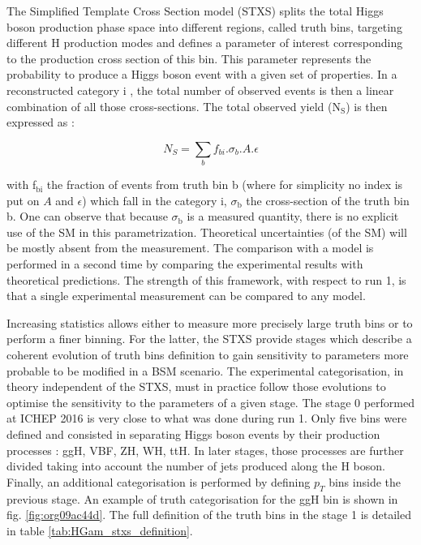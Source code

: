 The Simplified Template Cross Section \cite{arXiv_1605.04692} model (STXS) splits the total Higgs boson production phase space into different regions, called truth bins, targeting different H production modes and defines a parameter of interest corresponding to the production cross section of this bin.
This parameter represents the probability to produce a Higgs boson event with a given set of properties.
In a reconstructed category i , the total number of observed events is then a linear combination of all those cross-sections.
The total observed yield (N\(_{\text{S}}\)) is then expressed as :

\begin{equation}
N_S = \sum\limits_{b} f_{bi} .\sigma_{b} . A . \epsilon
\end{equation}

with f\(_{\text{bi}}\) the fraction of events from truth bin b (where for simplicity no index is put on $A$ and $\epsilon$) which fall in the category i, \(\sigma_{\text{b}}\) the cross-section of the truth bin b.
One can observe that because \(\sigma_{\text{b}}\) is a measured quantity, there is no explicit use of the SM in this parametrization.
Theoretical uncertainties (of the SM) will be mostly absent from the measurement.
The comparison with a model is performed in a second time by comparing the experimental results with theoretical predictions.
The strength of this framework, with respect to run 1, is that a single experimental measurement can be compared to any model.

Increasing statistics allows either to measure more precisely large truth bins or to perform a finer binning.
For the latter, the STXS provide stages which describe a coherent evolution of truth bins definition to gain sensitivity to parameters more probable to be modified in a BSM scenario.
The experimental categorisation, in theory independent of the STXS, must in practice follow those evolutions to optimise the sensitivity to the parameters of a given stage.
The stage 0 performed at ICHEP 2016 \cite{ATLAS-CONF-2016-081} is very close to what was done during run 1.
Only five bins were defined and consisted in separating Higgs boson events by their production processes : ggH, VBF, ZH, WH, ttH.
In later stages, those processes are further divided taking into account the number of jets produced along the H boson.
Finally, an additional categorisation is performed by defining $p_T$ bins inside the previous stage.
An example of truth categorisation for the ggH bin is shown in fig. \ref{fig:org09ac44d}.
The full definition of the truth bins in the stage 1 is detailed in table \ref{tab:HGam_stxs_definition}.

